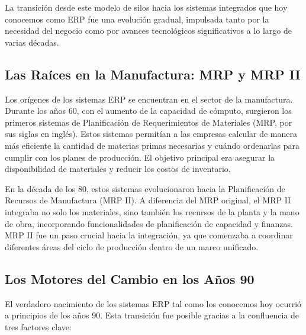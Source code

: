 \documentclass[12pt,letterpaper,spanish]{report}
\begin{document}
La transición desde este modelo de silos hacia los sistemas integrados que hoy conocemos como ERP fue una evolución gradual, impulsada tanto por la necesidad del negocio como por avances tecnológicos significativos a lo largo de varias décadas.

\subsection{Las Raíces en la Manufactura: MRP y MRP II}
Los orígenes de los sistemas ERP se encuentran en el sector de la manufactura. Durante los años 60, con el aumento de la capacidad de cómputo, surgieron los primeros sistemas de Planificación de Requerimientos de Materiales (MRP, por sus siglas en inglés). Estos sistemas permitían a las empresas calcular de manera más eficiente la cantidad de materias primas necesarias y cuándo ordenarlas para cumplir con los planes de producción. El objetivo principal era asegurar la disponibilidad de materiales y reducir los costos de inventario.

En la década de los 80, estos sistemas evolucionaron hacia la Planificación de Recursos de Manufactura (MRP II). A diferencia del MRP original, el MRP II integraba no solo los materiales, sino también los recursos de la planta y la mano de obra, incorporando funcionalidades de planificación de capacidad y finanzas. MRP II fue un paso crucial hacia la integración, ya que comenzaba a coordinar diferentes áreas del ciclo de producción dentro de un marco unificado.

\subsection{Los Motores del Cambio en los Años 90}
El verdadero nacimiento de los sistemas ERP tal como los conocemos hoy ocurrió a principios de los años 90. Esta transición fue posible gracias a la confluencia de tres factores clave:
\end{document}
